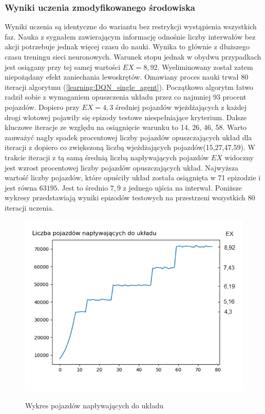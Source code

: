 \documentclass[12pt]{book}
\theoremstyle{plain}
\newcommand{\myref}[1]{(\ref{#1})}
\begin{document}
\subsubsection*{Wyniki uczenia zmodyfikowanego środowiska}
Wyniki uczenia są identyczne do wariantu bez restrykcji wystąpienia wszystkich faz. Nauka z sygnałem zawierającym informację odnośnie liczby interwałów bez akcji potrzebuje jednak więcej czasu do nauki. Wynika to głównie z dłuższego czasu treningu sieci neuronowych. Warunek stopu jednak w obydwu przypadkach jest osiągany przy tej samej wartości $EX=8,92$. Wyeliminowany został zatem niepożądany efekt zaniechania lewoskrętów. Omawiany proces nauki trwał 80 iteracji algorytmu \myref{learning:DQN_single_agent}. Początkowo algorytm łatwo radził sobie z wymaganiem opuszczenia układu przez co najmniej 93 procent pojazdów. Dopiero przy $EX=4,3$ średniej pojazdów wjeżdżających z każdej drogi wlotowej pojawiły się epizody testowe niespełniające  kryterium. Dalsze kluczowe iteracje ze względu na osiągnięcie warunku to 14, 26, 46, 58. Warto zauważyć nagły spadek procentowej liczby pojazdów opuszczających układ dla iteracji z dopiero co zwiększoną liczbą wjeżdżających pojazdów(15,27,47,59). W trakcie iteracji z tą samą średnią liczbą napływających pojazdów $EX$ widoczny jest wzrost procentowej liczby pojazdów opuszczających układ. Najwyższa wartość liczby pojazdów, które opuściły układ została osiągnięta w 71 epizodzie i jest równa $63 195$. Jest to średnio $7,9$ z jednego ujścia na interwał. Poniższe wykresy przedstawiają wyniki epizodów testowych na przestrzeni wszystkich 80 iteracji uczenia.
\begin{figure}[H]
	\centering
	\includegraphics[width=14cm]{images/poli_wyniki/plot_cars_in}
	\label{fig:env_poli_in}
	\centering
	\caption{Wykres pojazdów napływających do układu}
\end{figure} \noindent
\end{document}
